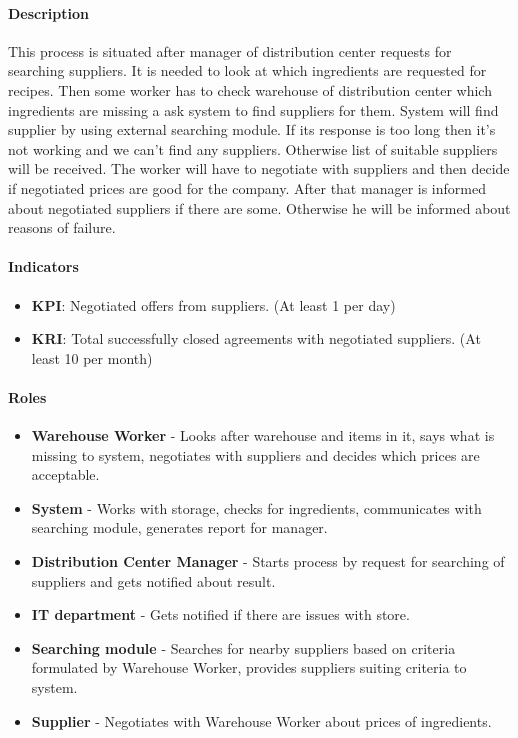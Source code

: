\documentclass[11pt,a4paper]{article}
\begin{document}
\paragraph{Description}

This process is situated after manager of distribution center requests for searching suppliers. It is needed to look at which ingredients are requested for recipes. Then some worker has to check warehouse of distribution center which ingredients are missing a ask system to find suppliers for them. System will find supplier by using external searching module. If its response is too long then it's not working and we can't find any suppliers. Otherwise list of suitable suppliers will be received. The worker will have to negotiate with suppliers and then decide if negotiated prices are good for the company. After that manager is informed about negotiated suppliers if there are some. Otherwise he will be informed about reasons of failure.

\paragraph{Indicators}

\begin{itemize}
    \item \textbf{KPI}: Negotiated offers from suppliers. (At least 1 per day)
    \item \textbf{KRI}: Total successfully closed agreements with negotiated suppliers. (At least 10 per month)
\end{itemize}

\paragraph{Roles}

\begin{itemize}
    \item \textbf{Warehouse Worker} - Looks after warehouse and items in it, says what is missing to system, negotiates with suppliers and decides which prices are acceptable.
    \item \textbf{System} - Works with storage, checks for ingredients, communicates with searching module, generates report for manager.
    \item \textbf{Distribution Center Manager} - Starts process by request for searching of suppliers and gets notified about result.
    \item \textbf{IT department} - Gets notified if there are issues with store.
    \item \textbf{Searching module} - Searches for nearby suppliers based on criteria formulated by Warehouse Worker, provides suppliers suiting criteria to system.
    \item \textbf{Supplier} - Negotiates with Warehouse Worker about prices of ingredients.
    
\end{itemize}
\end{document}
